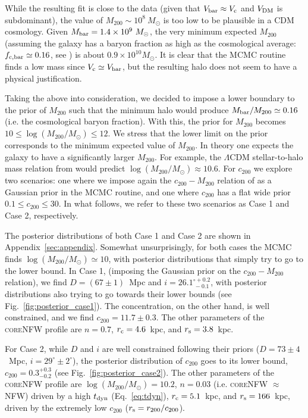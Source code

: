 \documentclass[fleqn,usenatbib]{mnras}
\begin{document}
While the resulting fit is close to the data (given that $V_{\rm bar} \approx V_{\rm c}$ and $V_{\rm DM}$ is subdominant), the value of $M_{200} \sim 10^8~M_\odot$ is too low to be plausible in a CDM cosmology. Given $M_{\rm bar} = 1.4\times 10^9~M_\odot$, the very minimum expected $M_{200}$ (assuming the galaxy has a baryon fraction as high as the cosmological average: $f_{\rm c,bar} \simeq 0.16$, see \citealt{bookFilippo}) is about $0.9\times 10^{10} M_\odot$. It is clear that the MCMC routine finds a low mass since $V_{\rm c} \simeq V_{\rm bar}$, but the resulting halo does not seem to have a physical justification.

Taking the above into consideration, we decided to impose a lower boundary to the prior of $M_{200}$ such that the minimum halo would produce $M_{\rm bar}/M_{200} \simeq 0.16$ (i.e. the cosmological baryon fraction). With this, the prior for $M_{200}$ becomes $10 \leq \log(M_{200}/M_\odot) \leq 12$. We stress that the lower limit on the prior corresponds to the minimum expected value of $M_{200}$. In theory one expects the galaxy to have a significantly larger $M_{200}$. For example, the $\Lambda$CDM stellar-to-halo mass relation from \citet{posti_galaxyhalo} would predict $\log(M_{200}/M_\odot) \approx 10.6$. For $c_{200}$ we explore two scenarios: one where we impose again the $c_{200}-M_{200}$ relation of \citet{duttonmaccio2014} as a Gaussian prior in the MCMC routine, and one where $c_{200}$ has a flat wide prior $0.1 \leq c_{200} \leq 30$. In what follows, we refer to these two scenarios as Case 1 and Case 2, respectively.

The posterior distributions of both Case 1 and Case 2 are shown in Appendix~\ref{sec:appendix}. Somewhat unsurprisingly, for both cases the MCMC finds $\log(M_{200}/M_\odot) \simeq 10$, with posterior distributions that simply try to go to the lower bound. In Case 1, (imposing the Gaussian prior on the $c_{200}-M_{200}$ relation), we find $D = (67\pm 1)$~Mpc and $i = 26.1^{\circ +0.2}_{~-0.1}$, with posterior distributions also trying to go towards their lower bounds (see Fig.~\ref{fig:posterior_case1}). The concentration, on the other hand, is well constrained, and we find $c_{200} = 11.7 \pm 0.3$. The other parameters of the \textsc{core}NFW profile are $n = 0.7$, $r_{\rm c} = 4.6$~kpc, and $r_{\rm s} = 3.8$~kpc. 

For Case 2, while $D$ and $i$ are well constrained following their priors ($D = 73\pm4$~Mpc, $i = 29^\circ \pm 2^\circ$), the posterior distribution of $c_{200}$ goes to its lower bound, $c_{200} = 0.3^{+0.3}_{-0.2}$ (see Fig.~\ref{fig:posterior_case2}). The other parameters of the \textsc{core}NFW profile are $\log(M_{200}/M_\odot)=10.2$, $n = 0.03$ (i.e. \textsc{core}NFW $\approx$ NFW) driven by a high $t_{\rm dyn}$ (Eq.~\ref{eq:tdyn}), $r_{\rm c} = 5.1$~kpc, and $r_{\rm s} = 166$~kpc, driven by the extremely low $c_{200}$ ($r_{\rm s} = r_{200}/c_{200}$).
\end{document}
